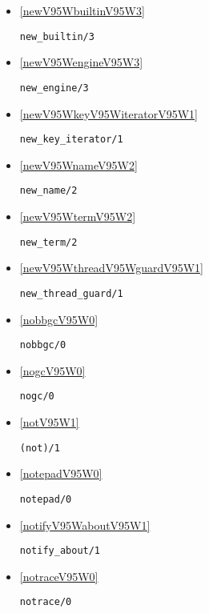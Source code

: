 \begin{itemize}
\item \ref{newV95WbuiltinV95W3} 
\begin{verbatim}
new_builtin/3
\end{verbatim}

\item \ref{newV95WengineV95W3} 
\begin{verbatim}
new_engine/3
\end{verbatim}

\item \ref{newV95WkeyV95WiteratorV95W1} 
\begin{verbatim}
new_key_iterator/1
\end{verbatim}

\item \ref{newV95WnameV95W2} 
\begin{verbatim}
new_name/2
\end{verbatim}

\item \ref{newV95WtermV95W2} 
\begin{verbatim}
new_term/2
\end{verbatim}

\item \ref{newV95WthreadV95WguardV95W1} 
\begin{verbatim}
new_thread_guard/1
\end{verbatim}

\item \ref{nobbgcV95W0} 
\begin{verbatim}
nobbgc/0
\end{verbatim}

\item \ref{nogcV95W0} 
\begin{verbatim}
nogc/0
\end{verbatim}

\item \ref{notV95W1} 
\begin{verbatim}
(not)/1
\end{verbatim}

\item \ref{notepadV95W0} 
\begin{verbatim}
notepad/0
\end{verbatim}

\item \ref{notifyV95WaboutV95W1} 
\begin{verbatim}
notify_about/1
\end{verbatim}

\item \ref{notraceV95W0} 
\begin{verbatim}
notrace/0
\end{verbatim}


\end{itemize}
